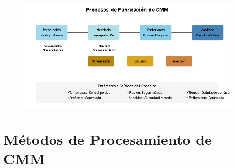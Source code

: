 \documentclass[letterpaper, 12pt]{article}
\begin{document}
\begin{figure}[H]
      \begin{center}
            \includegraphics[width=\linewidth]{Images/Imagen3.png}
            \label{Diagrama de flujo de los procesos de fabricación de CMM, como la sinterización, la extrusión o la inyección, mostrando como se integran los refuerzos con la matriz metálica.}
      \end{center}
\end{figure}

\section{Métodos de Procesamiento de CMM}
\end{document}
